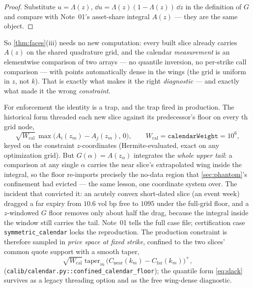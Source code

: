 \documentclass[11pt]{article}
\begin{document}
\begin{proof}
Substitute $u=\Lambda(z)$, $\dd u=\Lambda(z)(1-\Lambda(z))\,\dd z$ in the
definition of $G$ and compare with Note~01's asset-share integral
$A(z)$ --- they are the same object.
\end{proof}

So \cref{thm:faces}(iii) needs no new computation: every built slice already
carries $A(z)$ on the shared quadrature grid, and the calendar
\emph{measurement} is an elementwise comparison of two arrays --- no
quantile inversion, no per-strike call comparison --- with points
automatically dense in the wings (the grid is uniform in $z$, not $k$).
That is exactly what makes it the right \emph{diagnostic} --- and exactly
what made it the wrong \emph{constraint}.

For enforcement the identity is a trap, and the trap fired in production.
The historical form threaded each new slice against its predecessor's floor
on every \calstride th grid node,
\begin{equation}
\sqrt{W_{\text{cal}}}\,\max\!\big(A_i(z_m)-A_j(z_m),\,0\big),
\qquad W_{\text{cal}}=\texttt{calendarWeight}=10^6,
\label{eq:slack}
\end{equation}
keyed on the constraint $z$-coordinates (Hermite-evaluated, exact on any
optimization grid). But $G(\alpha)=A(z_\alpha)$ integrates the \emph{whole
upper tail}: a comparison at any single $\alpha$ carries the near slice's
extrapolated wing inside the integral, so the floor re-imports precisely
the no-data region that \cref{sec:phantom}'s confinement had evicted ---
the same lesson, one coordinate system over. The incident that convicted
it: an acutely convex short-dated slice (an event week) dragged a far
expiry from $10.6$ vol bp free to $1095$ under the full-grid floor, and a
$z$-windowed $G$ floor removes only about half the drag, because the
integral inside the window still carries the tail. Note~01 tells the full
case file; certification case \texttt{symmetric\_calendar} locks the
reproduction. The production constraint is therefore sampled in \emph{price
space at fixed strike}, confined to the two slices' common quote support
with a smooth taper,
\begin{equation}
\sqrt{W_{\text{cal}}}\;\mathrm{taper}_m\,
\big(C_{\text{near}}(k_m)-C_{\text{far}}(k_m)\big)^{+},
\label{eq:price_rows}
\end{equation}
(\nolinkurl{calib/calendar.py::confined_calendar_floor}); the quantile form
\eqref{eq:slack} survives as a legacy threading option and as the free
wing-dense diagnostic.
\end{document}
